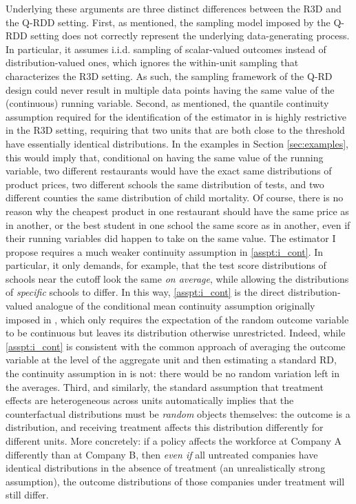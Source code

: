 \documentclass[12pt]{article}
\begin{document}
Underlying these arguments are three distinct differences between the R3D and the Q-RDD setting. First, as mentioned, the sampling model imposed by the Q-RDD setting does not correctly represent the underlying data-generating process. In particular, it assumes i.i.d. sampling of scalar-valued outcomes instead of distribution-valued ones, which ignores the within-unit sampling that characterizes the R3D setting. As such, the sampling framework of the Q-RD design could never result in multiple data points having the same value of the (continuous) running variable. Second, as mentioned, the quantile continuity assumption required for the identification of the estimator in \citet{frandsen2012quantile} is highly restrictive in the R3D setting, requiring that two units that are both close to the threshold have essentially identical distributions. In the examples in Section \ref{sec:examples}, this would imply that, conditional on having the same value of the running variable, two different restaurants would have the exact same distributions of product prices, two different schools the same distribution of tests, and two different counties the same distribution of child mortality. Of course, there is no reason why the cheapest product in one restaurant should have the same price as in another, or the best student in one school the same score as in another, even if their running variables did happen to take on the same value. The estimator I propose requires a much weaker continuity assumption in \ref{asspt:i_cont}. In particular, it only demands, for example, that the test score distributions of schools near the cutoff look the same \textit{on average}, while allowing the distributions of \textit{specific} schools to differ. In this way, \ref{asspt:i_cont} is the direct distribution-valued analogue of the conditional mean continuity assumption originally imposed in \citet[A2]{hahn2001identification}, which only requires the expectation of the random outcome variable to be continuous but leaves its distribution otherwise unrestricted. Indeed, while  \ref{asspt:i_cont} is consistent with the common approach of averaging the outcome variable at the level of the aggregate unit and then estimating a standard RD, the continuity assumption in \citet{frandsen2012quantile} is not: there would be no random variation left in the averages.
Third, and similarly, the standard assumption that treatment effects are heterogeneous across units automatically implies that the counterfactual distributions must be \textit{random} objects themselves: the outcome is a distribution, and receiving treatment affects this distribution differently for different units. More concretely: if a policy affects the workforce at Company A differently than at Company B, then \textit{even if} all untreated companies have identical distributions in the absence of treatment (an unrealistically strong assumption), the outcome distributions of those companies under treatment will still differ.  
\end{document}
